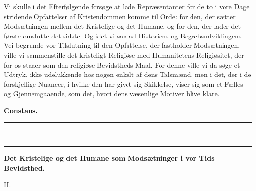 \documentclass[12pt,a4paper,openany]{book}
\newcommand{\secnum}[1]{\par\begin{center}#1\end{center}\par\nobreak}
\newcommand{\opage}[1]{\marginnote{\footnotesize\textit{[#1]}}}
\begin{document}
Vi skulle i det Efterfølgende forsøge at lade Repræsentanter
for de to i vore Dage stridende Opfattelser af Kristendommen
komme til Orde: for den, der sætter Modsætningen
mellem det Kristelige og det Humane, og for den,
der lader det første omslutte det sidste. Og idet vi saa ad
Historiens og Begrebsudviklingens Vei begrunde vor Tilslutning
til den Opfattelse, der fastholder Modsætningen,
ville vi sammenstille det kristeligt Religiøse med Humanitetens
Religiøsitet, der for os staaer som den religiøse Bevidstheds
Maal. For denne ville vi da søge et Udtryk, ikke
udelukkende hos nogen enkelt af dens Talsmænd, men i
det, der i de forskjellige Nuancer, i hvilke den har givet sig
Skikkelse, viser sig som et Fælles og Gjennemgaaende, som
det, hvori dens væsenlige Motiver blive klare.

\begin{flushright}\textbf{Constans.}\end{flushright}
\begin{center}\rule{2.6cm}{0.4pt}\\[-10pt]\rule{2.6cm}{0.4pt}\end{center}

\clearpage
\opage{433}\begin{center}\textbf{\large Det Kristelige og det Humane som Modsætninger i vor Tids Bevidsthed.}\end{center}

\secnum{II.}
\end{document}
